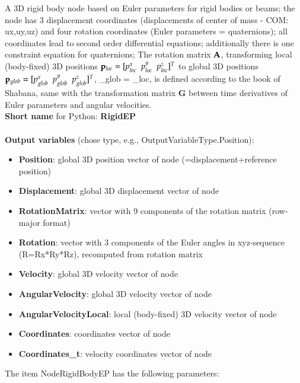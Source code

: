 A 3D rigid body node based on Euler parameters for rigid bodies or beams; the node has 3 displacement coordinates (displacements of center of mass - COM: ux,uy,uz) and four rotation coordinates (Euler parameters = quaternions); all coordinates lead to second order differential equations; additionally there is one constraint equation for quaternions; The rotation matrix $\mathbf{A}$, transforming local (body-fixed) 3D positions $\mathbf{p}_{loc} = [p^x_{loc}\;\;p^y_{loc}\;\;p^z_{loc}]^T$ to global 3D positions $\mathbf{p}_{glob} = [p^x_{glob}\;\;p^y_{glob}\;\;p^z_{glob}]^T$, \be \pv_{glob} = \Am \pv_{loc}, \ee is defined according to the book of Shabana, same with the transformation matrix $\mathbf{G}$ between time derivatives of Euler parameters and angular velocities.
 \\
{\bf Short name} for Python: {\bf RigidEP}
 \\\\ 
{\bf Output variables} (chose type, e.g., OutputVariableType.Position): 
\begin{itemize}
    \item {\bf Position}: global 3D position vector of node (=displacement+reference position)
    \item {\bf Displacement}: global 3D displacement vector of node
    \item {\bf RotationMatrix}: vector with 9 components of the rotation matrix (row-major format)
    \item {\bf Rotation}: vector with 3 components of the Euler angles in xyz-sequence (R=Rx*Ry*Rz), recomputed from rotation matrix
    \item {\bf Velocity}: global 3D velocity vector of node
    \item {\bf AngularVelocity}: global 3D velocity vector of node
    \item {\bf AngularVelocityLocal}: local (body-fixed) 3D velocity vector of node
    \item {\bf Coordinates}: coordinates vector of node
    \item {\bf Coordinates\_t}: velocity coordinates vector of node
\end{itemize}
The item NodeRigidBodyEP has the following parameters:

